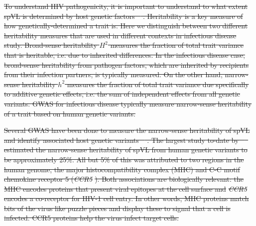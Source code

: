 \documentclass[11pt]{article} %
\providecommand{\DIFdel}[1]{{\protect\color{red}\sout{#1}}}                      %
\begin{document}
\begin{linenumbers}
\DIFdel{To understand HIV pathogenicity, it is important to understand to what extent spVL is determined by host genetic factors \mbox{%
\citep{Bartha2013, Dalmasso2008, Fellay2007, Pereyra2010, Fellay2009, Pelak2010, VanManen2011, McLaren2012}}\hskip0pt%
. Heritability is a key measure of how genetically-determined a trait is. Here we distinguish between two different heritability measures that are used in different contexts in infectious disease study. Broad-sense heritability $H^2$ measures the fraction of total trait variance that is heritable, i.e. due to inherited differences. In the infectious disease case, broad-sense heritability from pathogen factors, which are inherited by recipients from their infection partners, is typically measured. On the other hand, narrow-sense heritability $h^2$ measures the fraction of total trait variance due specifically to additive genetic effects, i.e. the sum of independent effects from all genetic variants. GWAS for infectious disease typically measure narrow-sense heritability of a trait based on human genetic variants.
}%

\DIFdel{Several GWAS have been done to measure the narrow-sense heritability of spVL and identify associated host genetic variants \mbox{%
\citep{Bartha2013, Dalmasso2008, Fellay2007, Pereyra2010, Fellay2009, Pelak2010, VanManen2011, McLaren2012}}\hskip0pt%
. The largest study to-date by \mbox{%
\citet{McLaren2015} }\hskip0pt%
estimated the narrow-sense heritability of spVL from human genetic variants to be approximately 25\%. All but 5\% of this was attributed to two regions in the human genome, the major histocompatibility complex (MHC) and C-C motif chemokine receptor 5 (}\emph{\DIFdel{CCR5}}%
\DIFdel{). Both associations are biologically relevant: the MHC encodes proteins that present viral epitopes at the cell surface and }\emph{\DIFdel{CCR5}} %
\DIFdel{encodes a co-receptor for HIV-1 cell entry. In other words, MHC proteins match bits of the virus like puzzle pieces and display these to signal that a cell is infected. CCR5 proteins help the virus infect target cells.
}%


\end{linenumbers}
\end{document}
